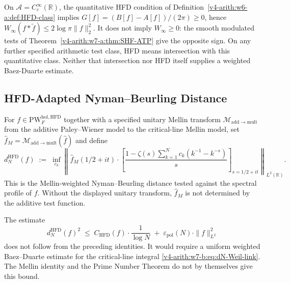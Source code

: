 On \(\mathscr A=C_c^\infty(\mathbb R)\), the quantitative HFD
condition of Definition~\ref{v4-arith:w6-a:def:HFD-class} implies
\(G[f]=(B[f]-A[f])/(2\pi)\ge0\), hence
\(W_\infty(f*\widetilde f)\le2\log\pi\|f\|_2^2\).
It does not imply \(W_\infty\ge0\): the smooth modulated tests of
Theorem~\ref{v4-arith:w7-a:thm:SHF-ATP} give the opposite sign.
On any further specified arithmetic test class, HFD means intersection
with this quantitative class. Neither that intersection nor HFD itself
supplies a weighted Baez-Duarte estimate.

\subsection{HFD-Adapted Nyman--Beurling Distance}
\label{v4-arith:w7-b:restricted-class:HFD}

\begin{definition}
\label{v4-arith:w7-b:def:dN-HFD}
For \(f\in\mathrm{PW}^{\mathrm{hol},\mathrm{HFD}}_{F}\)
together with a specified unitary Mellin transform
\(\mathcal{M}_{\mathrm{add}\to\mathrm{mult}}\) from the additive
Paley--Wiener model to the critical-line Mellin model, set
\(\widehat f_M=\mathcal{M}_{\mathrm{add}\to\mathrm{mult}}(\widehat f)\)
and define
\begin{equation}
\label{v4-arith:w7-b:eq:dN-HFD}
d_{N}^{\mathrm{HFD}}(f)\;:=\;\inf_{c_{k}}\!\left\|\widehat{f}_{M}(1/2+it)\cdot\!\left[\frac{1-\zeta(s)\sum_{k=1}^{N}c_{k}(k^{-1}-k^{-s})}{s}\right]_{s=1/2+it}\right\|_{L^{2}(\mathbb{R})}.
\end{equation}
This is the Mellin-weighted Nyman--Beurling distance tested against
the spectral profile of \(f\). Without the displayed unitary transform,
\(\widehat f_M\) is not determined by the additive test function.
\end{definition}

\begin{theorem}
\label{v4-arith:w7-b:thm:HFD-NB-bound}
The estimate
\begin{equation}
\label{v4-arith:w7-b:eq:HFD-NB-bound}
d_{N}^{\mathrm{HFD}}(f)^{2}
\;\leq\;
C_{\mathrm{HFD}}(f)\cdot\frac{1}{\log N}
\;+\;\varepsilon_{\mathrm{pol}}(N)\cdot\|f\|_{L^{2}}^{2}
\end{equation}
does not follow from the preceding identities. It would require a
uniform weighted Baez--Duarte estimate for the critical-line integral
\eqref{v4-arith:w7-b:eq:dN-Weil-link}. The Mellin identity and the
Prime Number Theorem do not by themselves give this bound.
\end{theorem}

